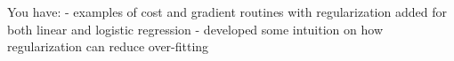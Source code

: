 \documentclass[11pt]{article}
\makeatletter
\newcommand{\boxspacing}{\kern\kvtcb@left@rule\kern\kvtcb@boxsep}
\newcommand{\prompt}[4]{
        \ttfamily\llap{{\color{#2}[#3]:\hspace{3pt}#4}}\vspace{-\baselineskip}
    }
\makeatother
\begin{document}
You have: - examples of cost and gradient routines with regularization
added for both linear and logistic regression - developed some intuition
on how regularization can reduce over-fitting

    \begin{tcolorbox}[breakable, size=fbox, boxrule=1pt, pad at break*=1mm,colback=cellbackground, colframe=cellborder]
\prompt{In}{incolor}{ }{\boxspacing}
\begin{Verbatim}[commandchars=\\\{\}]

\end{Verbatim}
\end{tcolorbox}


    
    
    
\end{document}
